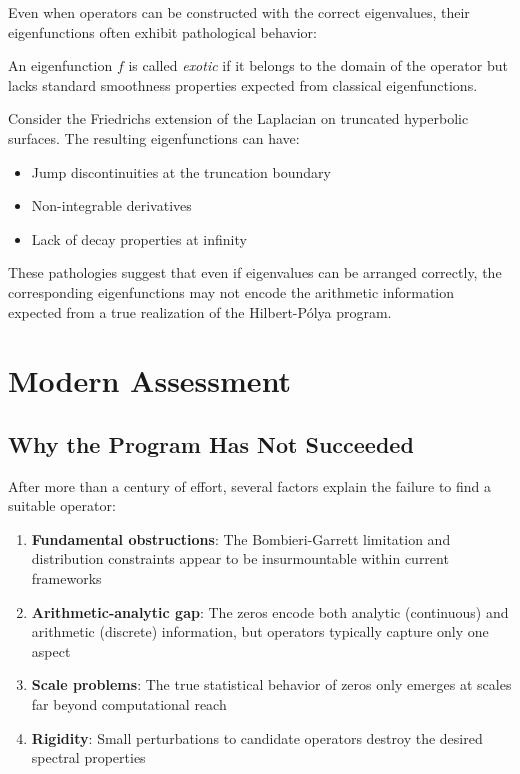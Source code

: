Even when operators can be constructed with the correct eigenvalues, their eigenfunctions often exhibit pathological behavior:

\begin{definition}
An eigenfunction $f$ is called \emph{exotic} if it belongs to the domain of the operator but lacks standard smoothness properties expected from classical eigenfunctions.
\end{definition}

\begin{example}
Consider the Friedrichs extension of the Laplacian on truncated hyperbolic surfaces. The resulting eigenfunctions can have:
\begin{itemize}
\item Jump discontinuities at the truncation boundary
\item Non-integrable derivatives
\item Lack of decay properties at infinity
\end{itemize}
\end{example}

These pathologies suggest that even if eigenvalues can be arranged correctly, the corresponding eigenfunctions may not encode the arithmetic information expected from a true realization of the Hilbert-Pólya program.

\section{Modern Assessment}
\label{sec:modern_assessment}

\subsection{Why the Program Has Not Succeeded}

After more than a century of effort, several factors explain the failure to find a suitable operator:

\begin{enumerate}
\item \textbf{Fundamental obstructions}: The Bombieri-Garrett limitation and distribution constraints appear to be insurmountable within current frameworks

\item \textbf{Arithmetic-analytic gap}: The zeros encode both analytic (continuous) and arithmetic (discrete) information, but operators typically capture only one aspect

\item \textbf{Scale problems}: The true statistical behavior of zeros only emerges at scales far beyond computational reach

\item \textbf{Rigidity}: Small perturbations to candidate operators destroy the desired spectral properties
\end{enumerate}

